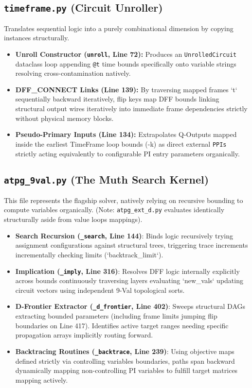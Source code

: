 \documentclass[12pt, a4paper]{article}
\begin{document}
\subsection{\texttt{timeframe.py} (Circuit Unroller)}
Translates sequential logic into a purely combinational dimension by copying instances structurally.
\begin{itemize}
    \item \textbf{Unroll Constructor (\texttt{unroll}, Line 72):} Produces an \texttt{UnrolledCircuit} dataclass loop appending \texttt{@t} time bounds specifically onto variable strings resolving cross-contamination natively. 
    \item \textbf{DFF\_CONNECT Links (Line 139):} By traversing mapped frames `t` sequentially backward iteratively, flip keys map DFF bounds linking structural output wires iteratively into immediate frame dependencies strictly without physical memory blocks.
    \item \textbf{Pseudo-Primary Inputs (Line 134):} Extrapolates Q-Outputs mapped inside the earliest TimeFrame loop bounds (-k) as direct external \texttt{PPIs} strictly acting equivalently to configurable PI entry parameters organically.
\end{itemize}

\subsection{\texttt{atpg\_9val.py} (The Muth Search Kernel)}
This file represents the flagship solver, natively relying on recursive bounding to compute variables organically. (Note: \texttt{atpg\_ext\_d.py} evaluates identically structurally aside from value loops mappings).
\begin{itemize}
    \item \textbf{Search Recursion (\texttt{\_search}, Line 144)}: Binds logic recursively trying assignment configurations against structural trees, triggering trace increments incrementally checking limits (`backtrack_limit`).
    \item \textbf{Implication (\texttt{\_imply}, Line 316)}: Resolves DFF logic internally explicitly across bounds continuously traversing layers evaluating `new_vals` updating circuit vectors using independent 9-Val topological sorts. 
    \item \textbf{D-Frontier Extractor (\texttt{\_d\_frontier}, Line 402)}: Sweeps structural DAGs extracting bounded parameters (including frame limits jumping flip boundaries on Line 417). Identifies active target ranges needing specific propagation arrays implicitly routing forward.
    \item \textbf{Backtracing Routines (\texttt{\_backtrace}, Line 239)}: Using objective maps defined strictly via controlling variables boundaries, paths span backward dynamically mapping non-controlling PI variables to fulfill target matrices mapping actively.
\end{itemize}
\end{document}
